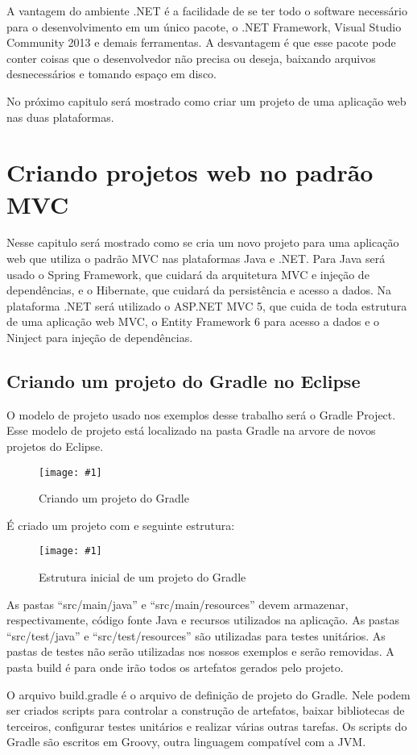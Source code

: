 \documentclass[a4paper,12pt]{article}
\newcommand{\figura}[2] {
	\begin{figure}[ht]
		\centering
		\texttt{[image: \#1]}
		\caption{#2}
	\end{figure}
	\FloatBarrier
}
\newcommand{\groovycode}[1] {
	\inputminted{groovy}{#1}
}
\begin{document}
A vantagem do ambiente .NET é a facilidade de se ter todo o software necessário para o desenvolvimento em um único pacote, o .NET Framework, Visual Studio Community 2013 e demais ferramentas. A desvantagem é que esse pacote pode conter coisas que o desenvolvedor não precisa ou deseja, baixando arquivos desnecessários e tomando espaço em disco.

No próximo capitulo será mostrado como criar um projeto de uma aplicação web nas duas plataformas.

\section{Criando projetos web no padrão MVC}

Nesse capitulo será mostrado como se cria um novo projeto para uma aplicação web que utiliza o padrão MVC nas plataformas Java e .NET. Para Java será usado o Spring Framework, que cuidará da arquitetura MVC e injeção de dependências, e o Hibernate, que cuidará da persistência e acesso a dados. Na plataforma .NET será utilizado o ASP.NET MVC 5, que cuida de toda estrutura de uma aplicação web MVC, o Entity Framework 6 para acesso a dados e o Ninject para injeção de dependências.

\subsection{Criando um projeto do Gradle no Eclipse}

O modelo de projeto usado nos exemplos desse trabalho será o Gradle Project. Esse modelo de projeto está localizado na pasta Gradle na arvore de novos projetos do Eclipse. 

\figura{gradleproject1.png}{Criando um projeto do Gradle}

É criado um projeto com e seguinte estrutura:

\figura{gradleproject1.png}{Estrutura inicial de um projeto do Gradle}

As pastas “src/main/java” e “src/main/resources” devem armazenar, respectivamente, código fonte Java e recursos utilizados na aplicação.  As pastas “src/test/java” e “src/test/resources” são utilizadas para testes unitários. As pastas de testes não serão utilizadas nos nossos exemplos e serão removidas. A pasta build é para onde irão todos os artefatos gerados pelo projeto.

O arquivo build.gradle é o arquivo de definição de projeto do Gradle. Nele podem ser criados scripts para controlar a construção de artefatos, baixar bibliotecas de terceiros, configurar testes unitários e realizar várias outras tarefas. Os scripts do Gradle são escritos em Groovy, outra linguagem compatível com a JVM.

\groovycode{code/buildgradle.txt}
\end{document}
